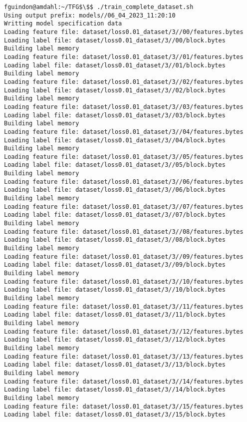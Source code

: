 \documentclass[12pt,oneside]{book}
\begin{document}
\begin{lstlisting}
fguindon@amdahl:~/TFG$\$$ ./train_complete_dataset.sh
Using output prefix: models//06_04_2023_11:20:10
Writting model specification data
Loading feature file: dataset/loss0.01_dataset/3//00/features.bytes
Loading label file: dataset/loss0.01_dataset/3//00/block.bytes
Building label memory
Loading feature file: dataset/loss0.01_dataset/3//01/features.bytes
Loading label file: dataset/loss0.01_dataset/3//01/block.bytes
Building label memory
Loading feature file: dataset/loss0.01_dataset/3//02/features.bytes
Loading label file: dataset/loss0.01_dataset/3//02/block.bytes
Building label memory
Loading feature file: dataset/loss0.01_dataset/3//03/features.bytes
Loading label file: dataset/loss0.01_dataset/3//03/block.bytes
Building label memory
Loading feature file: dataset/loss0.01_dataset/3//04/features.bytes
Loading label file: dataset/loss0.01_dataset/3//04/block.bytes
Building label memory
Loading feature file: dataset/loss0.01_dataset/3//05/features.bytes
Loading label file: dataset/loss0.01_dataset/3//05/block.bytes
Building label memory
Loading feature file: dataset/loss0.01_dataset/3//06/features.bytes
Loading label file: dataset/loss0.01_dataset/3//06/block.bytes
Building label memory
Loading feature file: dataset/loss0.01_dataset/3//07/features.bytes
Loading label file: dataset/loss0.01_dataset/3//07/block.bytes
Building label memory
Loading feature file: dataset/loss0.01_dataset/3//08/features.bytes
Loading label file: dataset/loss0.01_dataset/3//08/block.bytes
Building label memory
Loading feature file: dataset/loss0.01_dataset/3//09/features.bytes
Loading label file: dataset/loss0.01_dataset/3//09/block.bytes
Building label memory
Loading feature file: dataset/loss0.01_dataset/3//10/features.bytes
Loading label file: dataset/loss0.01_dataset/3//10/block.bytes
Building label memory
Loading feature file: dataset/loss0.01_dataset/3//11/features.bytes
Loading label file: dataset/loss0.01_dataset/3//11/block.bytes
Building label memory
Loading feature file: dataset/loss0.01_dataset/3//12/features.bytes
Loading label file: dataset/loss0.01_dataset/3//12/block.bytes
Building label memory
Loading feature file: dataset/loss0.01_dataset/3//13/features.bytes
Loading label file: dataset/loss0.01_dataset/3//13/block.bytes
Building label memory
Loading feature file: dataset/loss0.01_dataset/3//14/features.bytes
Loading label file: dataset/loss0.01_dataset/3//14/block.bytes
Building label memory
Loading feature file: dataset/loss0.01_dataset/3//15/features.bytes
Loading label file: dataset/loss0.01_dataset/3//15/block.bytes

\end{lstlisting}
\end{document}
